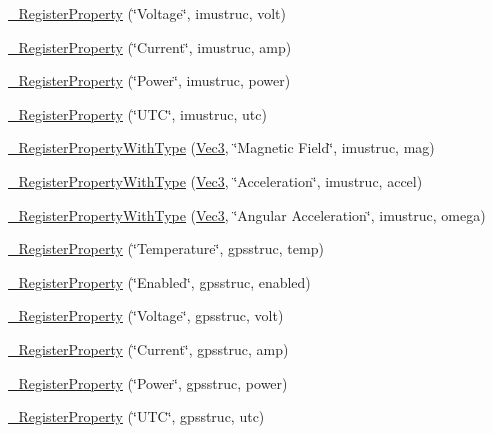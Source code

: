 \begin{DoxyCompactItemize}
\item 
\hyperlink{namespacecubesat_ae5a91e4b6e48712e562434b42513c2d3}{\+\_\+\+Register\+Property} (\char`\"{}Voltage\char`\"{}, imustruc, volt)
\item 
\hyperlink{namespacecubesat_a05da320713010c17ed4d36faf166aa3b}{\+\_\+\+Register\+Property} (\char`\"{}Current\char`\"{}, imustruc, amp)
\item 
\hyperlink{namespacecubesat_a2b386c8e128709bdfbe799722026f3e4}{\+\_\+\+Register\+Property} (\char`\"{}Power\char`\"{}, imustruc, power)
\item 
\hyperlink{namespacecubesat_a91e72884f2c0378e79caed44f9aec2d5}{\+\_\+\+Register\+Property} (\char`\"{}U\+TC\char`\"{}, imustruc, utc)
\item 
\hyperlink{namespacecubesat_a9bb9ea267b49409f5e5f3def53e6c772}{\+\_\+\+Register\+Property\+With\+Type} (\hyperlink{structcubesat_1_1Vec3}{Vec3}, \char`\"{}Magnetic Field\char`\"{}, imustruc, mag)
\item 
\hyperlink{namespacecubesat_ab7b60765b2dd5c25491859e2d56a9968}{\+\_\+\+Register\+Property\+With\+Type} (\hyperlink{structcubesat_1_1Vec3}{Vec3}, \char`\"{}Acceleration\char`\"{}, imustruc, accel)
\item 
\hyperlink{namespacecubesat_a6e92a530dcef22e2c783cf38ada3dd37}{\+\_\+\+Register\+Property\+With\+Type} (\hyperlink{structcubesat_1_1Vec3}{Vec3}, \char`\"{}Angular Acceleration\char`\"{}, imustruc, omega)
\item 
\hyperlink{namespacecubesat_a596edca6af979208673860da1074bda2}{\+\_\+\+Register\+Property} (\char`\"{}Temperature\char`\"{}, gpsstruc, temp)
\item 
\hyperlink{namespacecubesat_a172b87203fcfd282d69ccd8176dad916}{\+\_\+\+Register\+Property} (\char`\"{}Enabled\char`\"{}, gpsstruc, enabled)
\item 
\hyperlink{namespacecubesat_a634fb58ab8493b4ec489c448121cedea}{\+\_\+\+Register\+Property} (\char`\"{}Voltage\char`\"{}, gpsstruc, volt)
\item 
\hyperlink{namespacecubesat_ae6973f54d6433e2a0ad86817c28fb004}{\+\_\+\+Register\+Property} (\char`\"{}Current\char`\"{}, gpsstruc, amp)
\item 
\hyperlink{namespacecubesat_a065da1471a72c0441abe875b78575123}{\+\_\+\+Register\+Property} (\char`\"{}Power\char`\"{}, gpsstruc, power)
\item 
\hyperlink{namespacecubesat_a046f94447d56f9c89894965ee06a3caf}{\+\_\+\+Register\+Property} (\char`\"{}U\+TC\char`\"{}, gpsstruc, utc)
\item 

\end{DoxyCompactItemize}
